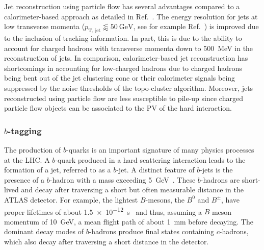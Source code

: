 Jet reconstruction using particle flow has several advantages compared to a
calorimeter-based approach as detailed in Ref.~\cite{PERF-2015-09}. The energy
resolution for jets at low transverse momenta
($p_\text{T, jet} \lessapprox \SI{50}{\GeV}$, see for example
Ref.~\cite{JETM-2018-05}) is improved due to the inclusion of tracking
information. In part, this is due to the ability to account for charged hadrons
with transverse momenta down to \SI{500}{\MeV} in the reconstruction of jets. In
comparison, calorimeter-based jet reconstruction has shortcomings in accounting
for low-\pT charged hadrons due to charged hadrons being bent out of the jet
clustering cone or their calorimeter signals being suppressed by the noise
thresholds of the topo-cluster algorithm. Moreover, jets reconstructed using
particle flow are less susceptible to pile-up since charged particle flow
objects can be associated to the PV of the hard interaction.


\subsubsection{$b$-tagging}

The production of $b$-quarks is an important signature of many physics processes
at the LHC. A $b$-quark produced in a hard scattering interaction leads to the
formation of a jet, referred to as a $b$-jet. A distinct feature of $b$-jets is
the presence of a $b$-hadron with a mass exceeding \SI{5}{\GeV}~\cite{pdg2020}.
These $b$-hadrons are short-lived and decay after traversing a short but often
measurable distance in the ATLAS detector. For example, the lightest $B$-mesons,
the $B^0$ and $B^\pm$, have proper lifetimes of about
\SI{1.5e-12}{\second}~\cite{pdg2020} and thus, assuming a $B$ meson momentum of
\SI{10}{\GeV}, a mean flight path of about \SI{1}{\milli\metre} before
decaying. The dominant decay modes of $b$-hadrons produce final states
containing $c$-hadrons, which also decay after traversing a short distance in
the detector.

